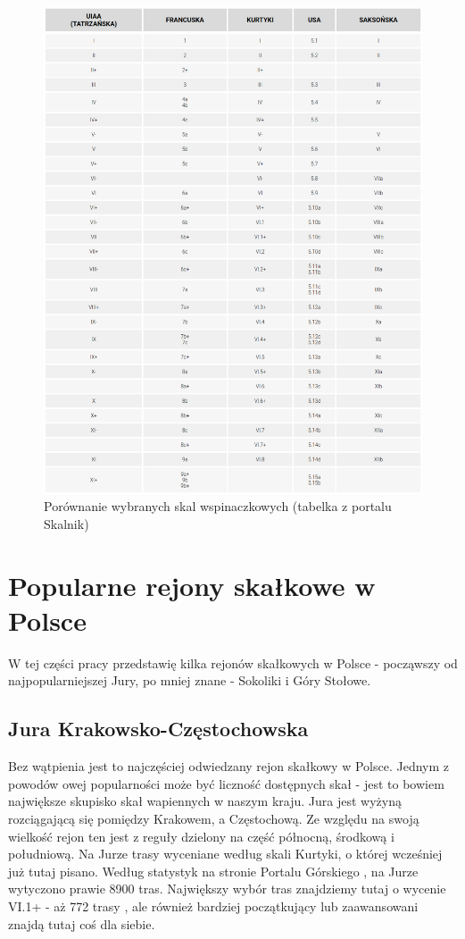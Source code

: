 \documentclass{article}
\begin{document}
\begin{figure}[!htbp]
	\begin{center}
		\includegraphics[width=\linewidth]{images/comparison.eps}
	\end{center}
	\caption{Porównanie wybranych skal wspinaczkowych (tabelka z portalu Skalnik)\cite{skalnik-skale}}
	\label{comparison}
\end{figure}

\section{Popularne rejony skałkowe w Polsce}
\lettrine[lines=2]{W}{} tej części pracy przedstawię kilka rejonów skałkowych w Polsce - począwszy od najpopularniejszej Jury, po mniej znane - Sokoliki i Góry Stołowe.

\subsection{Jura Krakowsko-Częstochowska}
Bez wątpienia jest to najczęściej odwiedzany rejon skałkowy w Polsce. Jednym z powodów owej popularności może być liczność dostępnych skał - jest to bowiem największe skupisko skał wapiennych w naszym kraju. Jura jest wyżyną rozciągającą się pomiędzy Krakowem, a Częstochową. Ze względu na swoją wielkość rejon ten jest z reguły dzielony na część północną, środkową i południową. Na Jurze trasy wyceniane według skali Kurtyki, o której wcześniej już tutaj pisano. Według statystyk na stronie Portalu Górskiego \cite{topo-jura}, na Jurze wytyczono prawie 8900 tras. Największy wybór tras znajdziemy tutaj o wycenie VI.1+ - aż 772 trasy \cite{topo-jura}, ale również bardziej początkujący lub zaawansowani znajdą tutaj coś dla siebie.
\end{document}

